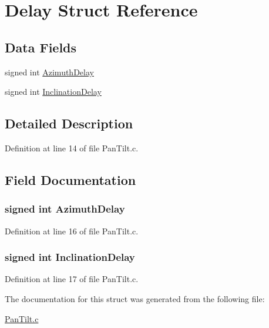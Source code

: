 \hypertarget{struct_delay}{\section{Delay Struct Reference}
\label{struct_delay}
}
\subsection*{Data Fields}
\begin{DoxyCompactItemize}
\item 
signed int \hyperlink{struct_delay_aacc83952fc6c5812597bc96d622f5317}{Azimuth\+Delay}
\item 
signed int \hyperlink{struct_delay_a4f5b10a6a07a4aaed02134ab2691b8ec}{Inclination\+Delay}
\end{DoxyCompactItemize}


\subsection{Detailed Description}


Definition at line 14 of file Pan\+Tilt.\+c.



\subsection{Field Documentation}
\hypertarget{struct_delay_aacc83952fc6c5812597bc96d622f5317}{
\subsubsection[{Azimuth\+Delay}]{\setlength{\rightskip}{0pt plus 5cm}signed int Azimuth\+Delay}}\label{struct_delay_aacc83952fc6c5812597bc96d622f5317}


Definition at line 16 of file Pan\+Tilt.\+c.

\hypertarget{struct_delay_a4f5b10a6a07a4aaed02134ab2691b8ec}{
\subsubsection[{Inclination\+Delay}]{\setlength{\rightskip}{0pt plus 5cm}signed int Inclination\+Delay}}\label{struct_delay_a4f5b10a6a07a4aaed02134ab2691b8ec}


Definition at line 17 of file Pan\+Tilt.\+c.



The documentation for this struct was generated from the following file\+:\begin{DoxyCompactItemize}
\item 
\hyperlink{_pan_tilt_8c}{Pan\+Tilt.\+c}\end{DoxyCompactItemize}
